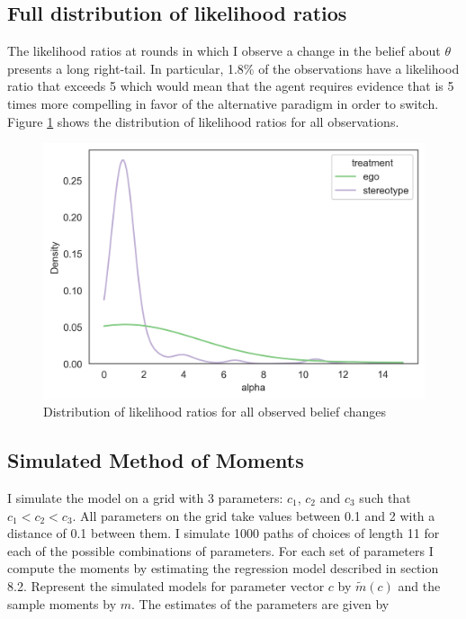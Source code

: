 \documentclass[
  12pt,
]{article}
\begin{document}
\hypertarget{full-distribution-of-likelihood-ratios}{%
\subsection{Full distribution of likelihood
ratios}\label{full-distribution-of-likelihood-ratios}}

The likelihood ratios at rounds in which I observe a change in the
belief about \(\theta\) presents a long right-tail. In particular, 1.8\%
of the observations have a likelihood ratio that exceeds 5 which would
mean that the agent requires evidence that is 5 times more compelling in
favor of the alternative paradigm in order to switch. Figure
\ref{fig:lr-hist} shows the distribution of likelihood ratios for all
observations.

\begin{figure}
\hypertarget{fig:lr-hist}{%
\centering
\includegraphics{../figures/lr_hist.png}
\caption{Distribution of likelihood ratios for all observed belief
changes}\label{fig:lr-hist}
}
\end{figure}

\hypertarget{simulated-method-of-moments}{%
\subsection{Simulated Method of
Moments}\label{simulated-method-of-moments}}

I simulate the model on a grid with 3 parameters: \(c_1\), \(c_2\) and
\(c_3\) such that \(c_1<c_2<c_3\). All parameters on the grid take
values between 0.1 and 2 with a distance of 0.1 between them. I simulate
1000 paths of choices of length 11 for each of the possible combinations
of parameters. For each set of parameters I compute the moments by
estimating the regression model described in section 8.2. Represent the
simulated models for parameter vector \(c\) by \(\tilde{m}(c)\) and the
sample moments by \(m\). The estimates of the parameters are given by
\end{document}
